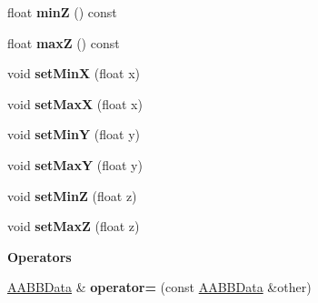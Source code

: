 \begin{Indent}
\begin{DoxyCompactItemize}
float {\bfseries minZ} () const
\item 
\mbox{\label{structrev_1_1_a_a_b_b_data_a4366a7fa0a1524c364d99a6d6a284976}} 
float {\bfseries maxZ} () const
\item 
\mbox{\label{structrev_1_1_a_a_b_b_data_ad039cf99cf961de662421858ade47085}} 
void {\bfseries set\+MinX} (float x)
\item 
\mbox{\label{structrev_1_1_a_a_b_b_data_aaa3c83b4f43efe0a21b74a7144e6b7e6}} 
void {\bfseries set\+MaxX} (float x)
\item 
\mbox{\label{structrev_1_1_a_a_b_b_data_aa3c5a2a98e7faf55f4d8dd735fb35c48}} 
void {\bfseries set\+MinY} (float y)
\item 
\mbox{\label{structrev_1_1_a_a_b_b_data_a939b8e4f191071ac357728dd00a4dd77}} 
void {\bfseries set\+MaxY} (float y)
\item 
\mbox{\label{structrev_1_1_a_a_b_b_data_afaa66608b0bc5985ac13a11c9152827f}} 
void {\bfseries set\+MinZ} (float z)
\item 
\mbox{\label{structrev_1_1_a_a_b_b_data_ad04e3c7b088218242b669688f7d9ca93}} 
void {\bfseries set\+MaxZ} (float z)
\end{DoxyCompactItemize}
\end{Indent}
\begin{Indent}\textbf{ Operators}\par
\begin{DoxyCompactItemize}
\item 
\mbox{\label{structrev_1_1_a_a_b_b_data_afe515b7a63cc0aba381818c581dfe321}} 
\mbox{\hyperlink{structrev_1_1_a_a_b_b_data}{A\+A\+B\+B\+Data}} \& {\bfseries operator=} (const \mbox{\hyperlink{structrev_1_1_a_a_b_b_data}{A\+A\+B\+B\+Data}} \&other)
\end{DoxyCompactItemize}
\end{Indent}
